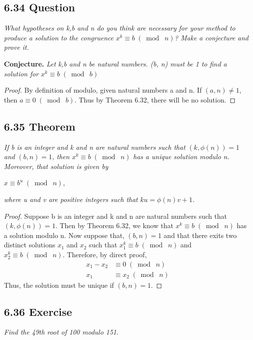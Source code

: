 \documentclass{article}
\begin{document}
\subsection*{6.34 Question} 
\quad \textit{What hypotheses on k,b and n do you think are necessary for your method to produce a solution to the congruence $x^k \equiv b \;(\bmod\; n)$? Make a conjecture and prove it.}

\textbf{Conjecture.} \textit{Let k,b and n be natural numbers. (b, n) must be 1 to find a solution for $x^k \equiv b \;(\bmod\; b)$}

\begin{proof}
By definition of modulo, given natural numbers a and n. If $(a,n) \neq 1$, then $a \equiv 0 \;(\bmod\; b)$. Thus by Theorem 6.32, there will be no solution.
\end{proof}

\subsection*{6.35 Theorem} 
\quad \textit{If b is an integer and k and n are natural numbers such that $(k, \phi(n)) = 1$ and $(b, n) = 1$, then $x^k \equiv b \;(\bmod\; n)$ has a unique solution modulo n. Moreover, that solution is given by}
\begin{center}
    $x \equiv b^u \;(\bmod\; n)$,
\end{center}
\textit{where u and v are positive integers such that $ku = \phi(n)v+1$.}

\begin{proof}
Suppose b is an integer and k and n are natural numbers such that $(k, \phi(n)) = 1$. Then by Theorem 6.32, we know that $x^k \equiv b \;(\bmod\; n)$ has a solution modulo n. Now suppose that, $(b, n) = 1$ and that there exits two distinct solutions $x_1$ and $x_2$ such that $x_1^k \equiv b \;(\bmod\; n)$ and $x_2^k \equiv b \;(\bmod\; n)$. Therefore, by direct proof,
    \begin{align*}
        &&x_1 - x_2 &\equiv 0 \;(\bmod\; n)&&\\
        &&x_1 &\equiv x_2 \;(\bmod\; n)&&
    \end{align*}
    Thus, the solution must be unique if $(b, n) = 1$.
\end{proof}

\subsection*{6.36 Exercise} 
\quad \textit{Find the 49th root of 100 modulo 151.}
\end{document}
